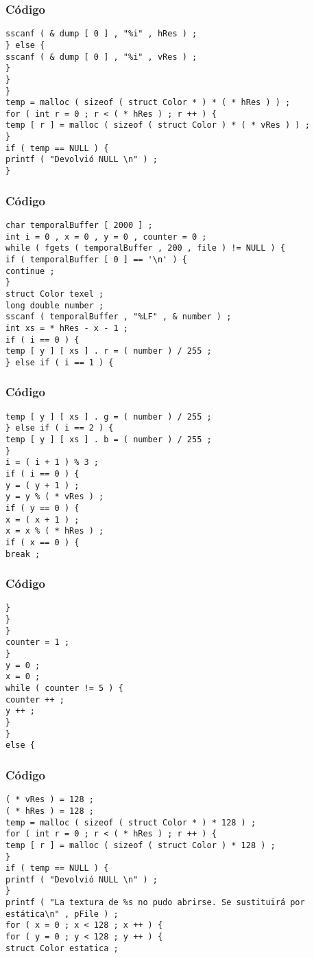 \documentclass{beamer}
\begin{document}
\begin{frame}[fragile]
\frametitle{C\'odigo}
\begin{verbatim}
sscanf ( & dump [ 0 ] , "%i" , hRes ) ; 
} else { 
sscanf ( & dump [ 0 ] , "%i" , vRes ) ; 
} 
} 
} 
temp = malloc ( sizeof ( struct Color * ) * ( * hRes ) ) ; 
for ( int r = 0 ; r < ( * hRes ) ; r ++ ) { 
temp [ r ] = malloc ( sizeof ( struct Color ) * ( * vRes ) ) ; 
} 
if ( temp == NULL ) { 
printf ( "Devolvió NULL \n" ) ; 
} 
\end{verbatim}
\end{frame}
\begin{frame}[fragile]
\frametitle{C\'odigo}
\begin{verbatim}
char temporalBuffer [ 2000 ] ; 
int i = 0 , x = 0 , y = 0 , counter = 0 ; 
while ( fgets ( temporalBuffer , 200 , file ) != NULL ) { 
if ( temporalBuffer [ 0 ] == '\n' ) { 
continue ; 
} 
struct Color texel ; 
long double number ; 
sscanf ( temporalBuffer , "%LF" , & number ) ; 
int xs = * hRes - x - 1 ; 
if ( i == 0 ) { 
temp [ y ] [ xs ] . r = ( number ) / 255 ; 
} else if ( i == 1 ) { 
\end{verbatim}
\end{frame}
\begin{frame}[fragile]
\frametitle{C\'odigo}
\begin{verbatim}
temp [ y ] [ xs ] . g = ( number ) / 255 ; 
} else if ( i == 2 ) { 
temp [ y ] [ xs ] . b = ( number ) / 255 ; 
} 
i = ( i + 1 ) % 3 ; 
if ( i == 0 ) { 
y = ( y + 1 ) ; 
y = y % ( * vRes ) ; 
if ( y == 0 ) { 
x = ( x + 1 ) ; 
x = x % ( * hRes ) ; 
if ( x == 0 ) { 
break ; 
\end{verbatim}
\end{frame}
\begin{frame}[fragile]
\frametitle{C\'odigo}
\begin{verbatim}
} 
} 
} 
counter = 1 ; 
} 
y = 0 ; 
x = 0 ; 
while ( counter != 5 ) { 
counter ++ ; 
y ++ ; 
} 
} 
else { 
\end{verbatim}
\end{frame}
\begin{frame}[fragile]
\frametitle{C\'odigo}
\begin{verbatim}
( * vRes ) = 128 ; 
( * hRes ) = 128 ; 
temp = malloc ( sizeof ( struct Color * ) * 128 ) ; 
for ( int r = 0 ; r < ( * hRes ) ; r ++ ) { 
temp [ r ] = malloc ( sizeof ( struct Color ) * 128 ) ; 
} 
if ( temp == NULL ) { 
printf ( "Devolvió NULL \n" ) ; 
} 
printf ( "La textura de %s no pudo abrirse. Se sustituirá por estática\n" , pFile ) ; 
for ( x = 0 ; x < 128 ; x ++ ) { 
for ( y = 0 ; y < 128 ; y ++ ) { 
struct Color estatica ; 
\end{verbatim}
\end{frame}
\end{document}
